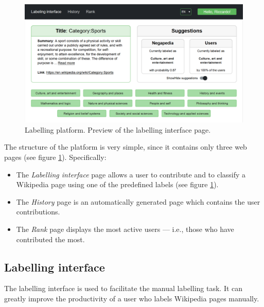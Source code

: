         \begin{figure}
            \centering
            \includegraphics[height=0.735\textwidth, angle=90]{images/website.png}
            \caption{Labelling platform. Preview of the labelling interface page.}
            \label{labelling_platform_img}
        \end{figure}
        
        The structure of the platform is very simple, since it contains only three web pages (see figure \ref{labelling_platform_img}). Specifically:
        \begin{itemize}
            \item The \emph{Labelling interface} page allows a user to contribute and to classify a Wikipedia page using one of the predefined labels (see figure \ref{labelling_platform_img}).
            \item The \emph{History} page is an automatically generated page which contains the user contributions.
            \item The \emph{Rank} page displays the most active users --- i.e., those who have contributed the most.
        \end{itemize}
        \subsection{Labelling interface}
            The labelling interface is used to facilitate the manual labelling task. It can greatly improve the productivity of a user who labels Wikipedia pages manually.
            
